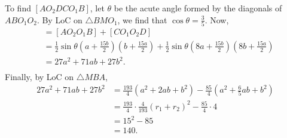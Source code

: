 \begin{enumerate}
 To find $[AO_2DCO_1B]$, let $\theta$ be the acute angle formed by the diagonals of $ABO_1O_2$. By LoC on $\triangle BMO_1$, we find that $\cos\theta = \frac 35$. Now, \begin{align*}[AO_2DCO_1B]&=[AO_2O_1B]+[CO_1O_2D]\\&=\frac 12\sin\theta\left(a + \frac{15b}{2}\right)\left(b + \frac{15a}{2}\right) + \frac 12\sin\theta\left(8a + \frac{15b}{2}\right)\left(8b + \frac{15a}{2}\right)\\&= 27a^2 + 71ab + 27b^2.\\\end{align*}
Finally, by LoC on $\triangle MBA$, \begin{align*}27a^2 + 71ab + 27b^2 &= \frac{193}{4}(a^2 + 2ab + b^2) - \frac{85}{4}\left(a^2 + \frac{6}{5}ab + b^2\right)\\&=\frac{193}{4}\cdot\frac{4}{193}(r_1 + r_2)^2-\frac{85}{4}\cdot 4\\&= 15^2 - 85\\&=\boxed{140}.\end{align*}
 

 


 


\end{enumerate}